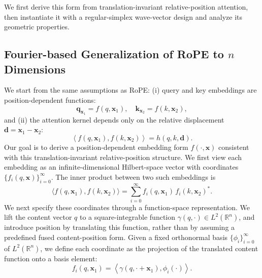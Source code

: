 \documentclass{article}
\theoremstyle{plain}
\theoremstyle{definition}
\theoremstyle{remark}
\begin{document}
We first derive this form from translation-invariant relative-position attention, then instantiate it with a regular-simplex wave-vector design and analyze its geometric properties.

\subsection{Fourier-based Generalization of RoPE to $n$ Dimensions}
\label{sec:ndrope}
We start from the same assumptions as RoPE: (i) query and key embeddings are position-dependent functions:
\begin{equation}
    \mathbf{q}_{\mathbf{x}_1} = f(q, \mathbf{x}_1), \quad 
    \mathbf{k}_{\mathbf{x}_2} = f(k, \mathbf{x}_2),
\end{equation}
and (ii) the attention kernel depends only on the relative displacement 
$\mathbf{d}=\mathbf{x}_1-\mathbf{x}_2$:
\begin{equation}
    \left\langle f(q, \mathbf{x}_1), f(k, \mathbf{x}_2) \right\rangle 
    = h(q,k,\mathbf{d}).
    \label{eq:initial2}
\end{equation}
Our goal is to derive a position-dependent embedding form $f(\cdot,\mathbf{x})$ consistent with this translation-invariant relative-position structure. We first view each embedding as an infinite-dimensional Hilbert-space vector with coordinates $\{f_i(q,\mathbf{x})\}_{i=0}^{\infty}$.
The inner product between two such embeddings is
\begin{equation}
    \langle f(q,\mathbf{x}_1), f(k,\mathbf{x}_2)\rangle
    =
    \sum_{i=0}^{\infty}
    f_i(q,\mathbf{x}_1)\,
    f_i(k,\mathbf{x}_2)^* .
\end{equation}
We next specify these coordinates through a function-space representation.
We lift the content vector $q$ to a square-integrable function 
$\gamma(q,\cdot)\in L^2(\mathbb{R}^n)$, and introduce position by translating this function, rather than by assuming a predefined fused content-position form.
Given a fixed orthonormal basis $\{\phi_i\}_{i=0}^{\infty}$ of $L^2(\mathbb{R}^n)$, we define each coordinate as the projection of the translated content function onto a basis element:
\begin{equation}
    f_i(q,\mathbf{x}_1) = \left\langle \gamma(q,\cdot+\mathbf{x}_1), \phi_i(\cdot) \right\rangle .
\end{equation}
\end{document}
